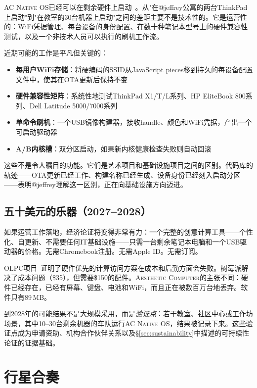 \documentclass[10pt,letterpaper,twocolumn]{article}
\newcommand{\ac}{\textsc{Aesthetic Computer}}
\newcommand{\acos}{\textsc{AC Native OS}}
\begin{document}
\acos{}已经可以在剩余硬件上启动~\citep{scudder2026os}。从"在@jeffrey公寓的两台ThinkPad上启动"到"在教室的30台机器上启动"之间的差距主要不是技术性的。它是运营性的：WiFi凭据管理、每台设备的身份配置、在数十种笔记本型号上的硬件兼容性测试，以及一个非技术人员可以执行的刷机工作流。

近期可能的工作是平凡但关键的：

\begin{itemize}
  \item \textbf{每用户WiFi存储}：将硬编码的SSID从JavaScript pieces移到持久的每设备配置文件中，使其在OTA更新后保持不变
  \item \textbf{硬件兼容性矩阵}：系统性地测试ThinkPad X1/T/L系列、HP EliteBook 800系列、Dell Latitude 5000/7000系列
  \item \textbf{单命令刷机}：一个USB镜像构建器，接收handle、颜色和WiFi凭据，产出一个可启动驱动器
  \item \textbf{A/B内核槽}：双分区启动，如果新内核健康检查失败则自动回滚
\end{itemize}

这些不是令人瞩目的功能。它们是艺术项目和基础设施项目之间的区别。代码库的轨迹——OTA更新已经工作、构建名称已经生成、设备身份已经刻入启动分区——表明@jeffrey理解这一区别，正在向基础设施方向迈进。

\subsection{五十美元的乐器（2027--2028）}

如果运营工作落地，经济论证将变得非常有力：一个完整的创意计算工具——个性化、自更新、不需要任何IT基础设施——只需一台剩余笔记本电脑和一个USB驱动器的价格。无需Chromebook注册。无需Apple ID。无需订阅。

OLPC项目~\citep{kraemer2009olpc}证明了硬件优先的计算访问方案在成本和后勤方面会失败。树莓派解决了成本问题（\$35），但需要\$150的配件。\ac{}的主张不同：硬件已经存在，已经有屏幕、键盘、电池和WiFi，而且正在被数百万台地丢弃。软件只有89\,MB。

到2028年的可能结果不是大规模采用，而是\emph{验证点}：若干教室、社区中心或工作坊场景，其中10--30台剩余机器的车队运行\acos{}，结果被记录下来。这些验证点成为申请资助、机构合作伙伴关系以及\S\ref{sec:sustainability}中描述的可持续性论证的证据基础。


\section{行星合奏}
\label{sec:ensembles}
\end{document}
